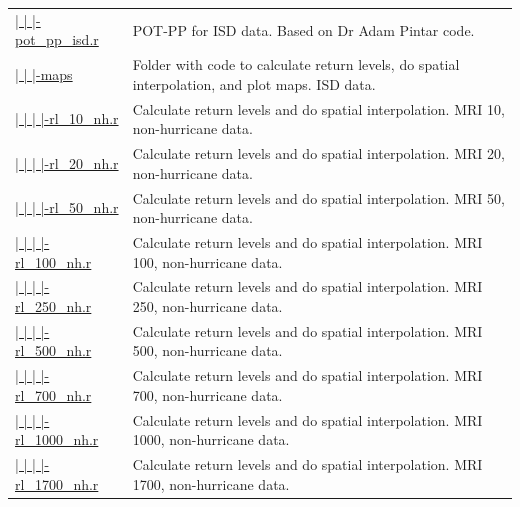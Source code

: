 \documentclass[12pt,oneside]{reedthesis}
\begin{document}
\begin{longtable}[t]{>{\raggedright\arraybackslash}p{1.3in}>{\raggedright\arraybackslash}p{4.9in}}
\href{ftp://ftp.geocorp.co/windthesis/code/pot_pp/isd/pot_pp_isd.r}{  |    |    |-pot\_pp\_isd.r} & POT-PP for ISD data. Based on Dr Adam Pintar code.\\
\href{ftp://ftp.geocorp.co/windthesis/code/pot_pp/isd/maps/}{  |    |    |-maps} & Folder with code to calculate return levels, do spatial interpolation, and plot maps. ISD data.\\
\href{ftp://ftp.geocorp.co/windthesis/code/pot_pp/isd/maps/return_levels_10_nh.r}{  |    |    |    |-rl\_10\_nh.r} & Calculate return levels and do spatial interpolation. MRI 10, non-hurricane data.\\
\href{ftp://ftp.geocorp.co/windthesis/code/pot_pp/isd/maps/return_levels_20_nh.r}{  |    |    |    |-rl\_20\_nh.r} & Calculate return levels and do spatial interpolation. MRI 20, non-hurricane data.\\
\href{ftp://ftp.geocorp.co/windthesis/code/pot_pp/isd/maps/return_levels_50_nh.r}{  |    |    |    |-rl\_50\_nh.r} & Calculate return levels and do spatial interpolation. MRI 50, non-hurricane data.\\
\href{ftp://ftp.geocorp.co/windthesis/code/pot_pp/isd/maps/return_levels_100_nh.r}{  |    |    |    |-rl\_100\_nh.r} & Calculate return levels and do spatial interpolation. MRI 100, non-hurricane data.\\
\href{ftp://ftp.geocorp.co/windthesis/code/pot_pp/isd/maps/return_levels_250_nh.r}{  |    |    |    |-rl\_250\_nh.r} & Calculate return levels and do spatial interpolation. MRI 250, non-hurricane data.\\
\href{ftp://ftp.geocorp.co/windthesis/code/pot_pp/isd/maps/return_levels_500_nh.r}{  |    |    |    |-rl\_500\_nh.r} & Calculate return levels and do spatial interpolation. MRI 500, non-hurricane data.\\
\href{ftp://ftp.geocorp.co/windthesis/code/pot_pp/isd/maps/return_levels_700_nh.r}{  |    |    |    |-rl\_700\_nh.r} & Calculate return levels and do spatial interpolation. MRI 700, non-hurricane data.\\
\href{ftp://ftp.geocorp.co/windthesis/code/pot_pp/isd/maps/return_levels_1000_nh.r}{  |    |    |    |-rl\_1000\_nh.r} & Calculate return levels and do spatial interpolation. MRI 1000, non-hurricane data.\\
\href{ftp://ftp.geocorp.co/windthesis/code/pot_pp/isd/maps/return_levels_1700_nh.r}{  |    |    |    |-rl\_1700\_nh.r} & Calculate return levels and do spatial interpolation. MRI 1700, non-hurricane data.\\

\end{longtable}
\end{document}
